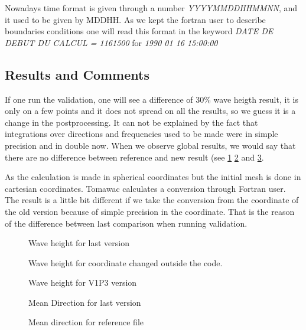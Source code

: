 Nowadays time format is given through a number \textit{YYYYMMDDHHMMNN}, and it used to be given by MDDHH. 
As we kept the fortran user to describe boundaries conditions one will read this format in the keyword \textit{DATE DE DEBUT DU CALCUL = 1161500} for \textit{1990 01 16 15:00:00}

\subsection{Results and Comments}

If one run the validation, one will see a difference of 30\% wave heigth result, it is only on a few points and it does not spread on all the results, so we guess it is a change in the postprocessing. It can not be explained by the fact that integrations over directions and frequencies used to be made were in simple precision and in double now.
When we observe global results, we would say that there are no difference between reference and new result (see \ref{figmanchehm0} \ref{figmanchehm02} and \ref{figmanchehm0v1P3}.

As the calculation is made in spherical coordinates but the initial mesh is done in cartesian coordinates. Tomawac calculates a conversion through Fortran user. The result is a little bit different if we take the conversion from the coordinate of the old version because of simple precision in the coordinate. That is the reason of the difference between last comparison when running validation.  

\begin{figure} [!h]
\centering
{}
 \caption{Wave height for last version}
\label{figmanchehm0}
\end{figure}
\begin{figure} [!h]
\centering
{}
 \caption{Wave height for coordinate changed outside the code.}
\label{figmanchehm02}
\end{figure}
\begin{figure} [!h]
\centering
{}
 \caption{Wave height for V1P3 version}
\label{figmanchehm0v1P3}
\end{figure}
\begin{figure} [!h]
\centering
{}
 \caption{Mean Direction for last version}
\label{figmanchedirection}
\end{figure}
\begin{figure} [!h]
\centering
{}
 \caption{Mean direction for reference file}
\label{figmanchedirectionref}
\end{figure}
